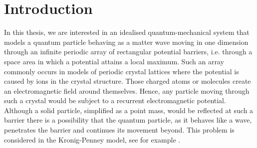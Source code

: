  \chapter{Introduction} \label{chap:1}

In this thesis, we are interested in an idealised quantum-mechanical system that models a quantum particle behaving as a matter wave moving in one dimension through an infinite periodic array of rectangular potential barriers, i.e. through a space area in which a potential attains a local maximum. Such an array commonly occurs in models of periodic crystal lattices where the potential is caused by ions in the crystal structure. Those charged atoms or molecules create an electromagnetic field around themselves. Hence, any particle moving through such a crystal would be subject to a recurrent electromagnetic potential. Although a solid particle, simplified as a point mass, would be reflected at such a barrier there is a possibility that the quantum particle, as it behaves like a wave, penetrates the barrier and continues its movement beyond. This problem is considered in the Kronig-Penney model, see for example \cite[Chapter 3]{heering2002elektrophysik}.
~\\

